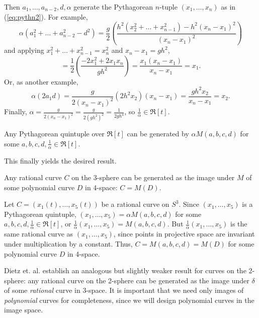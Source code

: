 Then $a_1,\ldots,a_{n-2},d,\alpha$ generate the Pythagorean $n$-tuple
$(x_1,\ldots,x_n)$ as in (\ref{eq:pythn2}).
For example,
\[
\alpha (a_1^2 + \ldots + a_{n-2}^2 - d^2)
= \frac{g}{2} 
  (\frac{h^2(x_2^2 + \ldots + x_{n-1}^2) - h^2(x_n - x_1)^2}{(x_n-x_1)^2})
\]
and applying $x_1^2 + \ldots + x_{n-1}^2 = x_n^2$ and $x_n - x_1 = gh^2$,
\[
= \frac{1}{2} (\frac{-2x_1^2 + 2x_1x_n}{gh^2})
= \frac{x_1(x_n - x_1)}{x_n - x_1} = x_1.
\]
Or, as another example,
\[
\alpha (2a_1 d) = \frac{g}{2(x_n - x_1)^2} (2h^2 x_2) (x_n - x_1)
		= \frac{gh^2 x_2}{x_n - x_1} = x_2.
\]
Finally, $\alpha = \frac{g}{2(x_n - x_1)^2} = \frac{g}{2(gh^2)^2} 
= \frac{1}{2gh^4}$, so $\frac{1}{\alpha} \in \Re[t]$.
\QED

\begin{corollary}
\label{thm:quintuplecondition}
Any Pythagorean quintuple over $\Re[t]$
can be generated by $\alpha M(a,b,c,d)$
for some $a,b,c,d,\frac{1}{\alpha} \in \Re[t]$.
\end{corollary}

This finally yields the desired result.

\begin{corollary}
Any rational curve $C$ on the 3-sphere can be generated as the
image under $M$ of some polynomial curve $D$ in 4-space: $C = M(D)$.
\end{corollary}
\prf
Let $C = (x_1(t),\ldots,x_5(t))$ be a rational curve on $S^3$.
Since $(x_1,\ldots,x_5)$ is a Pythagorean quintuple,
$(x_1,\ldots,x_5) = \alpha M(a,b,c,d)$ 
for some $a,b,c,d,\frac{1}{\alpha} \in \Re[t]$,
or $\frac{1}{\alpha}(x_1,\ldots,x_5) = M(a,b,c,d)$.
But $\frac{1}{\alpha}(x_1,\ldots,x_5)$ is the same rational curve 
as $(x_1,\ldots,x_5)$, since points in projective space are invariant
under multiplication by a constant.
Thus, $C = M(a,b,c,d) = M(D)$ for some polynomial curve $D$ in 4-space.
\QED

Dietz et. al. \cite{dietz93} establish an analogous but slightly weaker
result for curves on the 2-sphere:
any rational curve on the 2-sphere can be generated as
the image under $\delta$ of some {\em rational} curve in 3-space.
It is important that we need only images of {\em polynomial} curves for
completeness, since we will design polynomial curves in the image space.

